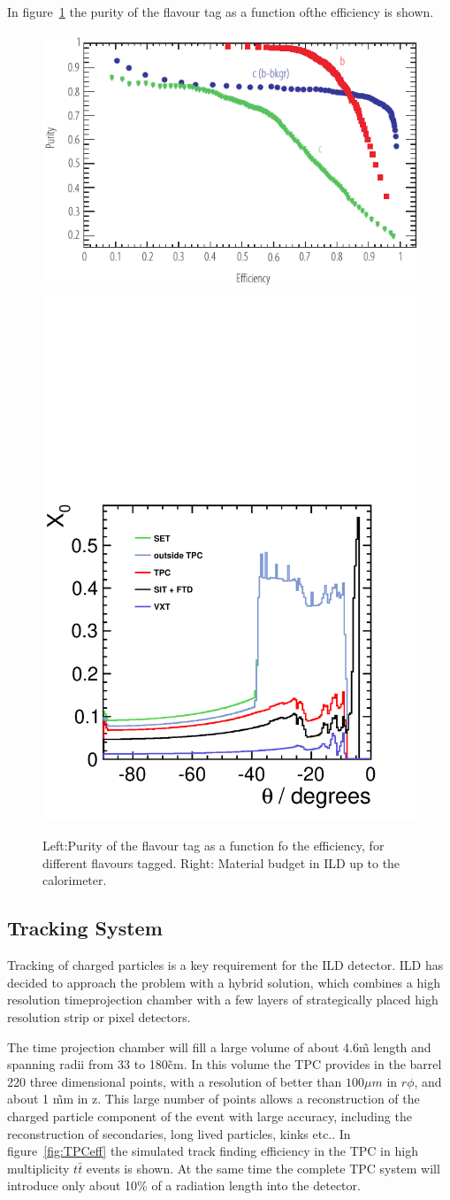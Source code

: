 \documentclass[%
 amsmath,amssymb,
 aps,
]{revtex4-1}
\begin{document}
In figure~\ref{fig-btag} the purity of the flavour tag as a function ofthe efficiency is shown. 
\begin{figure}
    \centering
    \includegraphics[width=0.45\hsize]{figures/FlavourTagPurities_Zpeak_DCR-eps-converted-to.pdf}
    \includegraphics[width=0.35\hsize]{figures/material-budget-new.pdf}
    \caption{Left:Purity of the flavour tag as a function fo the efficiency, for different flavours tagged. Right: Material budget in ILD up to the calorimeter.}
    \label{fig-btag}
\end{figure}  

\subsection{Tracking System}

Tracking of charged particles is a key requirement for the ILD detector. ILD has decided to approach the problem with a hybrid solution, which combines a high resolution timeprojection chamber with a few layers of strategically placed high resolution strip or pixel detectors. 

The time projection chamber will fill a large volume of about 4.6\~m length and spanning radii from 33 to 180\~cm. In this volume the TPC provides in the barrel 220 three dimensional points, with a resolution of better than $100 \mu m$ in $r \phi$, and about 1 \~mm in z. This large number of points allows a reconstruction of the charged particle component of the event with large accuracy, including the reconstruction of secondaries, long lived particles, kinks etc.. In figure~\ref{fig:TPCeff} the simulated track finding efficiency in the TPC in high multiplicity $t \bar t$ events is shown. At the same time the complete TPC system will introduce only about 10\% of a radiation length into the detector. 
\end{document}
